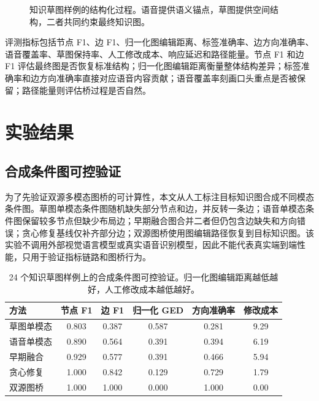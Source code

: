 \documentclass[UTF8,a4paper,12pt,fontset=fandol]{ctexart}
\begin{document}
\begin{figure}[H]
\centering
{}
\caption{知识草图样例的结构化过程。语音提供语义锚点，草图提供空间结构，二者共同约束最终知识图。}
\label{fig:sample}
\end{figure}

评测指标包括节点 F1、边 F1、归一化图编辑距离、标签准确率、边方向准确率、语音覆盖率、草图保持率、人工修改成本、响应延迟和路径能量。节点 F1 和边 F1 评估最终图是否恢复标准结构；归一化图编辑距离衡量整体结构差异；标签准确率和边方向准确率直接对应语音内容贡献；语音覆盖率刻画口头重点是否被保留；路径能量则评估桥过程是否自然。

\section{实验结果}

\subsection{合成条件图可控验证}

为了先验证双源多模态图桥的可计算性，本文从人工标注目标知识图合成不同模态条件图。草图单模态条件图随机缺失部分节点和边，并反转一条边；语音单模态条件图保留较多节点但缺少布局边；早期融合图合并二者但仍包含边缺失和方向错误；贪心修复基线仅补齐部分边；双源图桥使用图编辑路径恢复到目标知识图。该实验不调用外部视觉语言模型或真实语音识别模型，因此不能代表真实端到端性能，只用于验证指标链路和图桥行为。

\begin{table}[H]
\centering
\caption{24 个知识草图样例上的合成条件图可控验证。归一化图编辑距离越低越好，人工修改成本越低越好。}
\begin{tabular}{lccccc}
\toprule
方法 & 节点 F1 & 边 F1 & 归一化 GED & 方向准确率 & 修改成本 \\
\midrule
草图单模态 & 0.803 & 0.387 & 0.587 & 0.281 & 9.29 \\
语音单模态 & 0.890 & 0.564 & 0.391 & 0.394 & 6.19 \\
早期融合 & 0.929 & 0.577 & 0.391 & 0.466 & 5.94 \\
贪心修复 & 1.000 & 0.842 & 0.129 & 0.729 & 1.79 \\
双源图桥 & 1.000 & 1.000 & 0.000 & 1.000 & 0.00 \\
\bottomrule
\end{tabular}
\label{tab:results}
\end{table}
\end{document}
